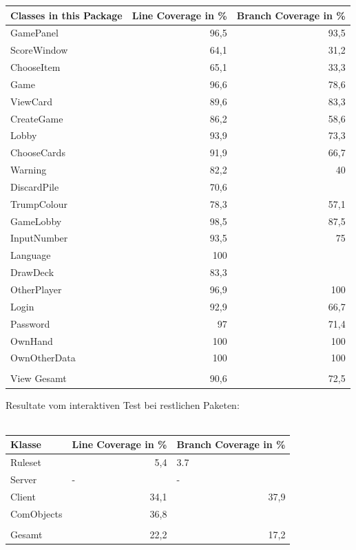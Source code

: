 \documentclass[a4paper]{article}
\begin{document}
	\noindent
\begin{tabular}{|l|r|r|}
\hline
Classes in this Package & \multicolumn{1}{l|}{Line Coverage in \%} & \multicolumn{1}{l|}{Branch Coverage in \%} \\ \hline
GamePanel & 96,5 & 93,5 \\ \hline
ScoreWindow & 64,1 & 31,2 \\ \hline
ChooseItem & 65,1 & 33,3 \\ \hline
Game & 96,6 & 78,6 \\ \hline
ViewCard & 89,6 & 83,3 \\ \hline
CreateGame & 86,2 & 58,6 \\ \hline
Lobby & 93,9 & 73,3 \\ \hline
ChooseCards & 91,9 & 66,7 \\ \hline
Warning & 82,2 & 40 \\ \hline
DiscardPile & 70,6 & \multicolumn{1}{l|}{} \\ \hline
TrumpColour & 78,3 & 57,1 \\ \hline
GameLobby & 98,5 & 87,5 \\ \hline
InputNumber & 93,5 & 75 \\ \hline
Language & 100 & \multicolumn{1}{l|}{} \\ \hline
DrawDeck & 83,3 & \multicolumn{1}{l|}{} \\ \hline
OtherPlayer & 96,9 & 100 \\ \hline
Login & 92,9 & 66,7 \\ \hline
Password & 97 & 71,4 \\ \hline
OwnHand & 100 & 100 \\ \hline
OwnOtherData & 100 & 100 \\ \hline
 & \multicolumn{1}{l|}{} & \multicolumn{1}{l|}{} \\ \hline
View Gesamt & 90,6 & 72,5 \\ \hline
\end{tabular}

 	Resultate vom interaktiven Test bei restlichen Paketen: \\\\
 	\noindent
 	\begin{tabular}{|l|r|l|}\hline
 	Klasse & Line Coverage in \% & Branch Coverage in \% \\ \hline \hline
Ruleset & 5,4 & 3.7 \\ \hline
Server & \multicolumn{1}{l|}{-} & - \\ \hline
Client & 34,1 & \multicolumn{1}{r|}{37,9} \\ \hline
ComObjects & 36,8 &  \\ \hline
 & \multicolumn{1}{l|}{} &  \\ \hline
Gesamt & 22,2 & \multicolumn{1}{r|}{17,2} \\ \hline
\end{tabular}
\end{document}
